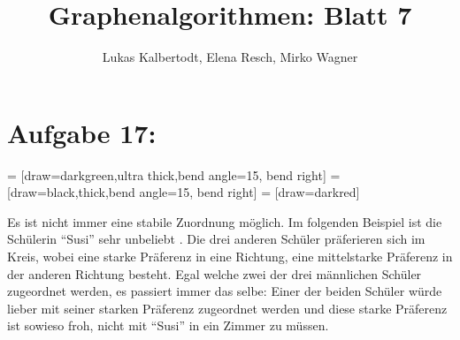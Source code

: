 \documentclass[11pt]{scrartcl} %
\title{Graphenalgorithmen: Blatt 7}
\author{Lukas Kalbertodt, Elena Resch, Mirko Wagner}
\begin{document}
\maketitle



\section*{Aufgabe 17:}
\begin{compactenum}[(a)]
 = [draw=darkgreen,ultra thick,bend angle=15, bend right]
 = [draw=black,thick,bend angle=15, bend right]
 = [draw=darkred]

\item \begin{minipage}[t][][t]{0.65\textwidth}
Es ist nicht immer eine stabile Zuordnung möglich. Im folgenden Beispiel ist die Schülerin \enquote{Susi} sehr unbeliebt \frownie{}. Die drei anderen Schüler präferieren sich im Kreis, wobei eine starke Präferenz in eine Richtung, eine mittelstarke Präferenz in der anderen Richtung besteht. Egal welche zwei der drei männlichen Schüler zugeordnet werden, es passiert immer das selbe: Einer der beiden Schüler würde lieber mit seiner starken Präferenz zugeordnet werden und diese starke Präferenz ist sowieso froh, nicht mit \enquote{Susi} in ein Zimmer zu müssen.
\end{minipage}
\begin{minipage}[t][][c]{0.35\textwidth}
\begin{center}
    \\[0.5cm]
\end{center}
\end{minipage}\\[0.5cm]

\end{compactenum}
\end{document}
